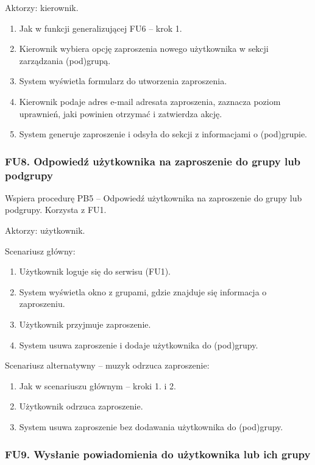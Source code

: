 \documentclass[11pt,a4paper]{article}
\renewcommand{\_}{\char`_}
\begin{document}
Aktorzy: kierownik.
\begin{enumerate}
    \item Jak w funkcji generalizującej FU6 – krok 1.
    \item Kierownik wybiera opcję zaproszenia nowego użytkownika w sekcji zarządzania (pod)grupą.
    \item System wyświetla formularz do utworzenia zaproszenia.
    \item Kierownik podaje adres e-mail adresata zaproszenia, zaznacza poziom uprawnień, jaki powinien otrzymać i zatwierdza akcję.
    \item System generuje zaproszenie i odsyła do sekcji z informacjami o (pod)grupie.
\end{enumerate}

\subsubsection{FU8. Odpowiedź użytkownika na zaproszenie do grupy lub podgrupy}

Wspiera procedurę PB5 – Odpowiedź użytkownika na zaproszenie do grupy lub podgrupy. Korzysta z FU1.

Aktorzy: użytkownik.

Scenariusz główny:
\begin{enumerate}
    \item Użytkownik loguje się do serwisu (FU1).
    \item System wyświetla okno z grupami, gdzie znajduje się informacja o zaproszeniu.
    \item Użytkownik przyjmuje zaproszenie.
    \item System usuwa zaproszenie i dodaje użytkownika do (pod)grupy.
\end{enumerate}

Scenariusz alternatywny – muzyk odrzuca zaproszenie:
\begin{enumerate}
    \item Jak w scenariuszu głównym – kroki 1. i 2.
    \item Użytkownik odrzuca zaproszenie.
    \item System usuwa zaproszenie bez dodawania użytkownika do (pod)grupy.
\end{enumerate}

\subsubsection{FU9. Wysłanie powiadomienia do użytkownika lub ich grupy}
\end{document}

